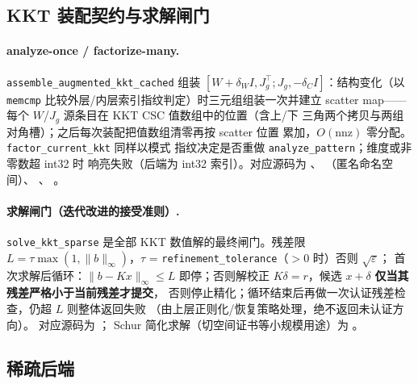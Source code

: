 \subsection{KKT 装配契约与求解闸门}
\label{subsec:engine-kkt-contract}

\paragraph{analyze-once / factorize-many.}
\texttt{assemble\_augmented\_kkt\_cached} 组装
$[W + \delta_W I, J_g^{\top}; J_g, -\delta_C I]$：结构变化（以
\texttt{memcmp} 比较外层/内层索引指纹判定）时三元组组装一次并建立
scatter map——每个 $W$/$J_g$ 源条目在 KKT CSC 值数组中的位置（含上/下
三角两个拷贝与两组对角槽）；之后每次装配把值数组清零再按 scatter 位置
累加，$O(\mathrm{nnz})$ 零分配。\texttt{factor\_current\_kkt} 同样以模式
指纹决定是否重做 \texttt{analyze\_pattern}；维度或非零数超 int32 时
响亮失败（后端为 int32 索引）。对应源码为
、
（匿名命名空间）、
、
。

\paragraph{求解闸门（迭代改进的接受准则）.}
\texttt{solve\_kkt\_sparse} 是全部 KKT 数值解的最终闸门。残差限
$L = \tau \max(1, \|b\|_{\infty})$，$\tau$ =
\texttt{refinement\_tolerance}（$>0$ 时）否则 $\sqrt{\varepsilon}$；
首次求解后循环：$\|b - K x\|_{\infty} \le L$ 即停；否则解校正
$K \delta = r$，候选 $x + \delta$ \textbf{仅当其残差严格小于当前残差才提交}，
否则停止精化；循环结束后再做一次认证残差检查，仍超 $L$ 则整体返回失败
（由上层正则化/恢复策略处理，绝不返回未认证方向）。
对应源码为 ；
Schur 简化求解（切空间证书等小规模用途）为
。

\subsection{稀疏后端}
\label{subsec:engine-la-backends}

